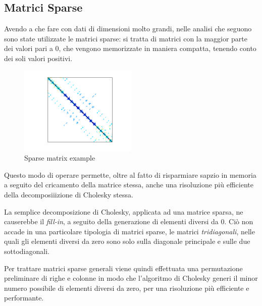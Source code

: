 \subsection{Matrici Sparse}

Avendo a che fare con dati di dimensioni molto grandi, nelle analisi che seguono sono state utilizzate le matrici sparse: si tratta di matrici con la maggior parte dei valori pari a 0, che vengono memorizzate in maniera compatta, tenendo conto dei soli valori positivi.

\begin{figure}[h!]
    \centering
    \includegraphics[width=0.5\textwidth]{figs/shallow_water1.png}
    \caption{Sparse matrix example}
    \label{fig:sparse_matrix_example}
\end{figure}

Questo modo di operare permette, oltre al fatto di risparmiare sapzio in memoria a seguito del cricamento della matrice stessa, anche una risoluzione più efficiente della decomposiiizione di Cholesky stessa.

La semplice decomposizione di Cholesky, applicata ad una matrice sparsa, ne causerebbe il \textit{fill-in}, a seguito della generazione di elementi diversi da 0. Ciò non accade in una particolare tipologia di matrici sparse, le matrici \textit{tridiagonali}, nelle quali gli elementi diversi da zero sono solo sulla diagonale principale e sulle due sottodiagonali.

Per trattare matrici sparse generali viene quindi effettuata una permutazione preliminare di righe e colonne in modo che l’algoritmo di Cholesky generi il minor numero possibile di elementi diversi da zero, per una risoluzione più efficiente e performante. 
